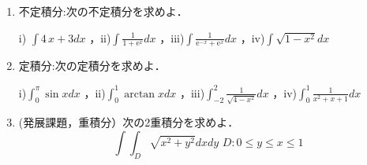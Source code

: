 \begin{enumerate}
\item 不定積分:次の不定積分を求めよ．

i) $\int 4\,x+3{dx}$
，ii)$\displaystyle \int  \frac{1}{ 1+\mbox{e}^{x} }{dx}$
，iii)$\displaystyle \int  \frac{1}{ \mbox{e}^{-x}+\mbox{e}^{x} }{dx}$
，iv)$\displaystyle \int  \sqrt{1-{x}^{2}}{dx}$


\item 定積分:次の定積分を求めよ．

i)$\displaystyle \int _{0}^{\pi } \sin x{dx}$
，ii)$\displaystyle \int _{0}^{1} \arctan x{dx}$
，iii)$\displaystyle \int _{-2}^{2} \frac{1}{ \sqrt{4-{x}^{2}} }{dx}$
，iv)$\displaystyle \int _{0}^{1} \frac{1}{ {x}^{2}+x+1 }{dx}$

\item (発展課題，重積分）次の2重積分を求めよ．
\begin{equation*}
\int \int_{D} \sqrt{x^2+y^2}dxdy\,\, D:0\leq y \leq x \leq 1
\end{equation*}
\end{enumerate}